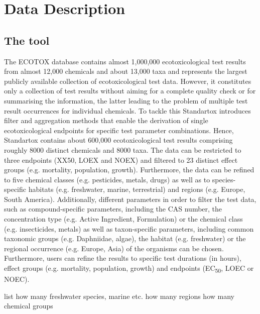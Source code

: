\section{Data Description}

\subsection{The tool}
The ECOTOX database contains almost 1,000,000 ecotoxicological test results from almost 12,000 chemicals and about 13,000 taxa \citep{usepa_ecotox_2019} and represents the largest publicly available collection of ecotoxicological test data. However, it constitutes only a collection of test results without aiming for a complete quality check or for summarising the information, the latter leading to the problem of multiple test result occurrences for individual chemicals. To tackle this Standartox introduces filter and aggregation methods that enable the derivation of single ecotoxicological endpoints for specific test parameter combinations. Hence, Standartox contains about 600,000 ecotoxicological test results comprising roughly 8000 distinct chemicals and 8000 taxa. The data can be restricted to three endpoints (XX50, LOEX and NOEX) and filtered to 23 distinct effect groups (e.g. mortality, population, growth). Furthermore, the data can be refined to five chemical classes (e.g. pesticides, metals, drugs) as well as to species-specific habitats (e.g. freshwater, marine, terrestrial) and regions (e.g. Europe, South America). Additionally, different parameters in order to filter the test data, such as compound-specific parameters, including the CAS number, the concentration type (e.g. Active Ingredient, Formulation) or the chemical class (e.g. insecticides, metals) as well as taxon-specific parameters, including common taxonomic groups (e.g. Daphniidae, algae), the habitat (e.g. freshwater) or the regional occurrence (e.g. Europe, Asia) of the organisms can be chosen. Furthermore, users can refine the results to specific test durations (in hours), effect groups (e.g. mortality, population, growth) and endpoints (EC\textsubscript{50}, LOEC or NOEC).






list how many freshwater species, marine etc.
how many regions
how many chemical groups



